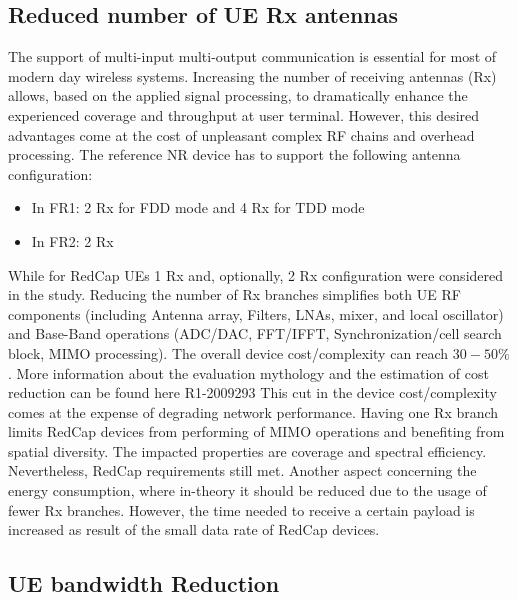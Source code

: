 \documentclass[conference]{IEEEtran}
\begin{document}
\subsection{Reduced number of UE Rx antennas}
\label{sec:4-1}

The support of multi-input multi-output communication is essential for most of  modern day wireless systems. Increasing the number of receiving antennas (Rx) allows, based on the applied signal processing, to dramatically enhance the experienced coverage and throughput at user terminal. However, this desired advantages come at the cost of unpleasant complex RF chains and overhead processing. The reference NR device has to support the following antenna configuration:
\begin{itemize}
    \item In FR1: 2 Rx for FDD mode and 4 Rx for TDD mode
    \item In FR2: 2 Rx
\end{itemize}
While for RedCap UEs 1 Rx and, optionally, 2 Rx configuration were considered in the study.
Reducing the number of Rx branches simplifies both UE RF components (including Antenna array, Filters, LNAs, mixer, and local oscillator) and Base-Band operations (ADC/DAC, FFT/IFFT, Synchronization/cell search block, MIMO processing). The overall device cost/complexity can reach $30-50\%$. More information about the evaluation mythology and the estimation of cost reduction can be found here R1-2009293 \cite{3gpp.R1-2009293}
This cut in the device cost/complexity comes at the expense of degrading network performance. Having one Rx branch limits RedCap devices from performing of MIMO operations and benefiting from spatial diversity. The impacted properties are coverage and spectral efficiency. Nevertheless, RedCap requirements still met. Another aspect concerning the energy consumption, where in-theory it should be reduced due to the usage of fewer Rx branches. However, the time needed to receive a certain payload is increased as result of the small data rate of RedCap devices.

\subsection{UE bandwidth Reduction}
\label{sec:4-2}
\end{document}
